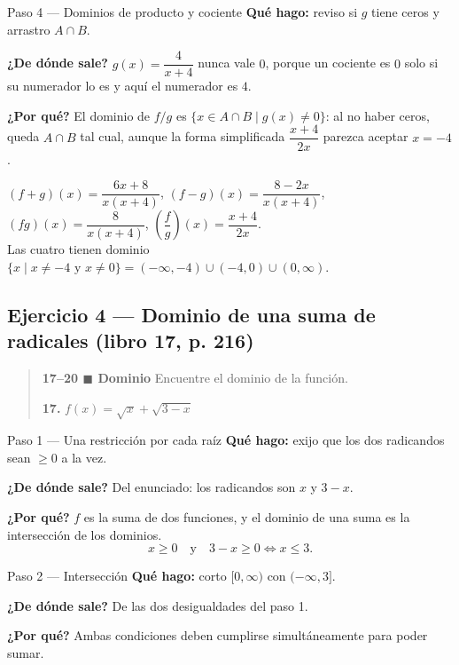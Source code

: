 \documentclass[11pt]{article}
\begin{document}
\begin{paso}{Paso 4 --- Dominios de producto y cociente}
\textbf{Qué hago:} reviso si $g$ tiene ceros y arrastro $A\cap B$.

\textbf{¿De dónde sale?} $g(x)=\dfrac{4}{x+4}$ nunca vale $0$, porque un cociente es $0$ solo si su numerador lo es y aquí el numerador es $4$.

\textbf{¿Por qué?} El dominio de $f/g$ es $\{x\in A\cap B\mid g(x)\neq 0\}$: al no haber ceros, queda $A\cap B$ tal cual, aunque la forma simplificada $\dfrac{x+4}{2x}$ parezca aceptar $x=-4$.
\end{paso}

\begin{resp}
$(f+g)(x)=\dfrac{6x+8}{x(x+4)}$, \; $(f-g)(x)=\dfrac{8-2x}{x(x+4)}$, \; $(fg)(x)=\dfrac{8}{x(x+4)}$, \; $\left(\dfrac{f}{g}\right)(x)=\dfrac{x+4}{2x}$.\\[2pt]
Las cuatro tienen dominio $\{x\mid x\neq -4 \text{ y } x\neq 0\}=(-\infty,-4)\cup(-4,0)\cup(0,\infty)$.
\end{resp}

\subsection*{Ejercicio 4 — Dominio de una suma de radicales (libro 17, p. 216)}

\begin{quote}
\textbf{17--20 $\blacksquare$ Dominio} \quad Encuentre el dominio de la función.

\textbf{17.} $f(x)=\sqrt{x}+\sqrt{3-x}$
\end{quote}

\begin{paso}{Paso 1 --- Una restricción por cada raíz}
\textbf{Qué hago:} exijo que los dos radicandos sean $\ge 0$ a la vez.

\textbf{¿De dónde sale?} Del enunciado: los radicandos son $x$ y $3-x$.

\textbf{¿Por qué?} $f$ es la suma de dos funciones, y el dominio de una suma es la intersección de los dominios.
\[
x\ge 0 \quad\text{y}\quad 3-x\ge 0 \iff x\le 3 .
\]
\end{paso}

\begin{paso}{Paso 2 --- Intersección}
\textbf{Qué hago:} corto $[0,\infty)$ con $(-\infty,3]$.

\textbf{¿De dónde sale?} De las dos desigualdades del paso 1.

\textbf{¿Por qué?} Ambas condiciones deben cumplirse simultáneamente para poder sumar.
\end{paso}
\end{document}
